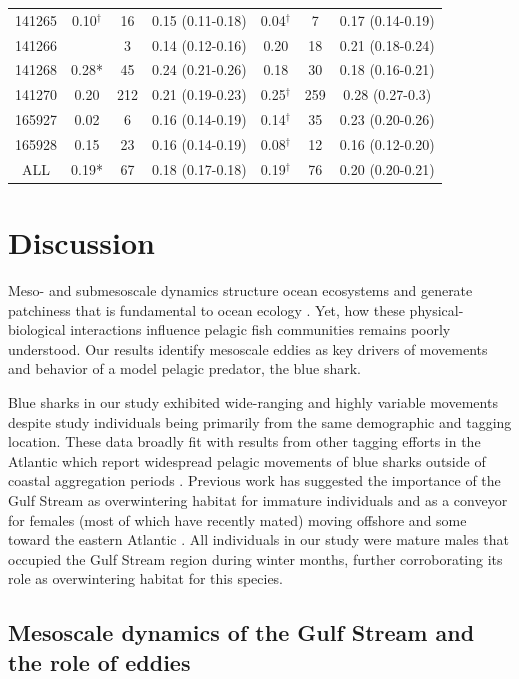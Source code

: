 \begin{table}
\begin{tabular}[t]{ccccccc}
141265 & 0.10$^{\dagger}$ & 16 & 0.15 (0.11-0.18) & 0.04$^{\dagger}$ & 7 & 0.17 (0.14-0.19)\\
141266 &  & 3 & 0.14 (0.12-0.16) & 0.20 & 18 & 0.21 (0.18-0.24)\\
141268 & 0.28* & 45 & 0.24 (0.21-0.26) & 0.18 & 30 & 0.18 (0.16-0.21)\\
141270 & 0.20 & 212 & 0.21 (0.19-0.23) & 0.25$^{\dagger}$ & 259 & 0.28 (0.27-0.3)\\
165927 & 0.02 & 6 & 0.16 (0.14-0.19) & 0.14$^{\dagger}$ & 35 & 0.23 (0.20-0.26)\\
165928 & 0.15 & 23 & 0.16 (0.14-0.19) & 0.08$^{\dagger}$ & 12 & 0.16 (0.12-0.20)\\
ALL & 0.19* & 67 & 0.18 (0.17-0.18) & 0.19$^{\dagger}$ & 76 & 0.20 (0.20-0.21)\\
\bottomrule
\end{tabular}
\end{table}

\section{Discussion}

Meso- and submesoscale dynamics structure ocean ecosystems and generate patchiness that is fundamental to ocean ecology \citep{McGillicuddy2016, Mahadevan2016}. Yet, how these physical-biological interactions influence pelagic fish communities remains poorly understood. Our results identify mesoscale eddies as key drivers of movements and behavior of a model pelagic predator, the blue shark.

Blue sharks in our study exhibited wide-ranging and highly variable movements despite study individuals being primarily from the same demographic and tagging location. These data broadly fit with results from other tagging efforts in the Atlantic which report widespread pelagic movements of blue sharks outside of coastal aggregation periods \citep{Vandeperre2014, Campana2011, Howey2017}. Previous work has suggested the importance of the Gulf Stream as overwintering habitat for immature individuals \citep{Campana2011} and as a conveyor for females (most of which have recently mated) moving offshore and some toward the eastern Atlantic \citep[reviewed in][]{Nakano2008}. All individuals in our study were mature males that occupied the Gulf Stream region during winter months, further corroborating its role as overwintering habitat for this species.

\subsection{Mesoscale dynamics of the Gulf Stream and the role of eddies}

